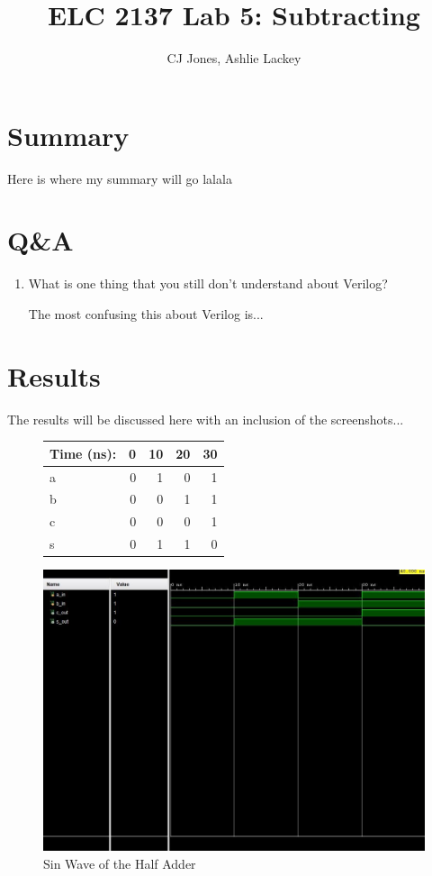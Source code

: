 \documentclass[11pt]{article}
\begin{document}
\title{ELC 2137 Lab 5: Subtracting}
\author{CJ Jones, Ashlie Lackey}

\maketitle


\section*{Summary}

Here is where my summary will go lalala


\section*{Q\&A}

\begin{enumerate}
	\item What is one thing that you still don’t understand about Verilog?
	
	The most confusing this about Verilog is...
\end{enumerate}




\section*{Results}

The results will be discussed here with an inclusion of the screenshots...
\begin{figure}[ht]\centering
	\begin{tabular}{l|rrrr}
		Time (ns): & 0 & 10 & 20 & 30 \\
		\midrule 
		a & 0 & 1 & 0 & 1 \\
		b & 0 & 0 & 1 & 1 \\
		\midrule
		c & 0 & 0 & 0 & 1 \\
		s & 0 & 1 & 1 & 0 \\ \bottomrule
	\end{tabular}\medskip
	
\end{figure}
\begin{figure}
	\includegraphics[width=1.0\textwidth]{"HalfAdder"}
	\caption{Sin Wave of the Half Adder}
\end{figure}
\clearpage
\end{document}
